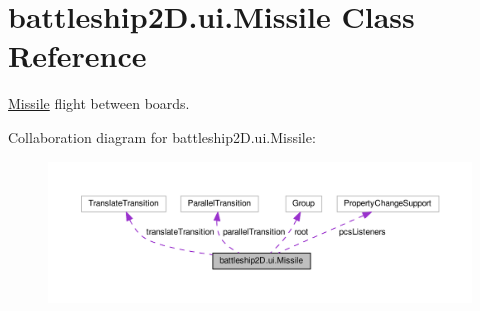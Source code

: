 \hypertarget{classbattleship2D_1_1ui_1_1Missile}{\section{battleship2\-D.\-ui.\-Missile Class Reference}
\label{classbattleship2D_1_1ui_1_1Missile}
}


\hyperlink{classbattleship2D_1_1ui_1_1Missile}{Missile} flight between boards.  




Collaboration diagram for battleship2\-D.\-ui.\-Missile\-:\nopagebreak
\begin{figure}[H]
\begin{center}
\leavevmode
\includegraphics[width=350pt]{classbattleship2D_1_1ui_1_1Missile__coll__graph}
\end{center}
\end{figure}

